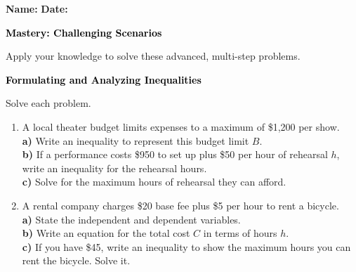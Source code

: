 \documentclass[12pt, letterpaper, fleqn]{article}
\newcommand{\blanklong}{\underline{\hspace{6.5cm}}}
\begin{document}
\textbf{Name:} \underline{\hspace{5cm}}
\hfill
\textbf{Date:} \underline{\hspace{3cm}}\\

\begin{tcolorbox}[colback=customteal!20]
    \large\textcolor{black}{\textbf{Mastery: Challenging Scenarios}}
\end{tcolorbox}

\vspace{3mm}
\noindent
Apply your knowledge to solve these advanced, multi-step problems.

\vspace{4mm}

\begin{tcolorbox}[colback=customteal!20]
\large\textcolor{black}{\textbf{Formulating and Analyzing Inequalities}}
\end{tcolorbox}

\noindent
Solve each problem.

\vspace{3mm}
\begin{enumerate}[itemsep=1.5cm, leftmargin=0.6cm]
\item A local theater budget limits expenses to a maximum of \$1,200 per show. \\
\textbf{a)} Write an inequality to represent this budget limit $B$. \blanklong \\
\textbf{b)} If a performance costs \$950 to set up plus \$50 per hour of rehearsal $h$, write an inequality for the rehearsal hours. \blanklong \\
\textbf{c)} Solve for the maximum hours of rehearsal they can afford. \blanklong
\vspace{1.5cm}
\item A rental company charges \$20 base fee plus \$5 per hour to rent a bicycle. \\
\textbf{a)} State the independent and dependent variables. \blanklong \\
\textbf{b)} Write an equation for the total cost $C$ in terms of hours $h$. \blanklong \\
\textbf{c)} If you have \$45, write an inequality to show the maximum hours you can rent the bicycle. Solve it. \blanklong
\vspace{1.5cm}
\end{enumerate}
\newpage
\end{document}
